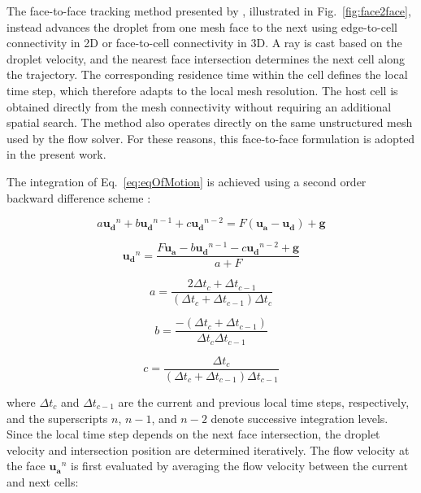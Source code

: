 The face-to-face tracking method presented by \cite{rendall2014finite}, illustrated in Fig.~\ref{fig:face2face}, instead advances the droplet from one mesh face to the next using edge-to-cell connectivity in 2D or face-to-cell connectivity in 3D. A ray is cast based on the droplet velocity, and the nearest face intersection determines the next cell along the trajectory. The corresponding residence time within the cell defines the local time step, which therefore adapts to the local mesh resolution. The host cell is obtained directly from the mesh connectivity without requiring an additional spatial search. The method also operates directly on the same unstructured mesh used by the flow solver. For these reasons, this face-to-face formulation is adopted in the present work.

The integration of Eq.~\ref{eq:eqOfMotion} is achieved using a second order backward difference scheme \cite{rendall2014finite}:

\begin{equation}
a \boldsymbol{u_d}^n + b \boldsymbol{u_d}^{n-1} + c \boldsymbol{u_d}^{n-2} = F (\boldsymbol{u_a}-\boldsymbol{u_d}) + \textbf{g}
\label{eq:BDF1}
\end{equation}

\begin{equation}
 \boldsymbol{u_d}^{n} = \frac{F \boldsymbol{u_a} - b \boldsymbol{u_d}^{n-1}  - c \boldsymbol{u_d}^{n-2} +\textbf{g}}{a + F}
\label{eq:BDF2_Time}
\end{equation}

\begin{equation}
a = \frac{2\Delta t_c+\Delta t_{c-1}}{(\Delta t_c+\Delta t_{c-1})\Delta t_c}
\label{eq:alpha}
\end{equation}

\begin{equation}
b = \frac{-(\Delta t_c+\Delta t_{c-1})}{\Delta t_c\Delta t_{c-1}}
\label{eq:beta}
\end{equation}

\begin{equation}
c = \frac{\Delta t_c}{(\Delta t_c+\Delta t_{c-1})\Delta t_{c-1}}
\label{eq:gamma}
\end{equation}

\noindent where $\Delta t_c$ and $\Delta t_{c-1}$ are the current and previous local time steps, respectively, and the superscripts $n$, $n-1$, and $n-2$ denote successive integration levels. Since the local time step depends on the next face intersection, the droplet velocity and intersection position are determined iteratively. The flow velocity at the face $\boldsymbol{u_a}^n$ is first evaluated by averaging the flow velocity between the current and next cells:

